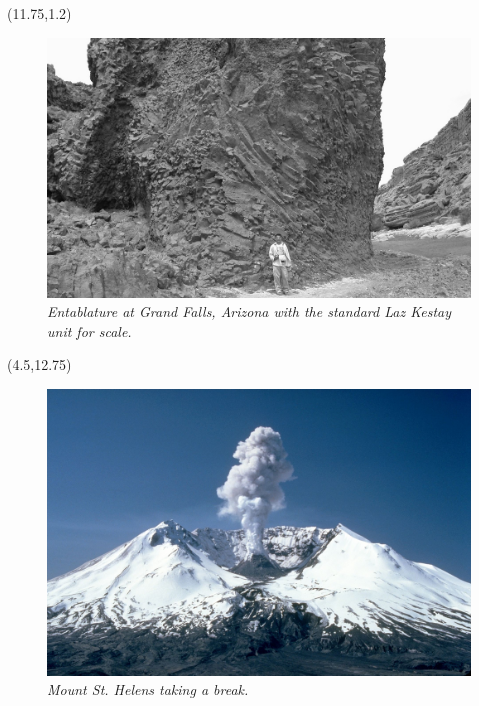 \documentclass[lpsc]{lpscposter}
\begin{document}
\begin{textblock}{7}(11.75,1.2)
\begin{center}
\begin{figure}
\includegraphics[width=\textwidth]{Milazzo_Columnar_Jointing_grand_falls_grey_crop}
	\caption{
	\scriptsize
	{\em Entablature at Grand Falls, Arizona with the standard Laz Kestay unit for scale.}
	\label{GrandFalls}
	}
\end{figure}
\end{center}
\end{textblock}


\begin{textblock}{7}(4.5,12.75)
\begin{figure}
	\includegraphics[width=\textwidth]{MSH_1982}
	\caption{
	\scriptsize
	{\em Mount St. Helens taking a break.}
	\label{msh}
	}
\end{figure}
\end{textblock}
\end{document}

